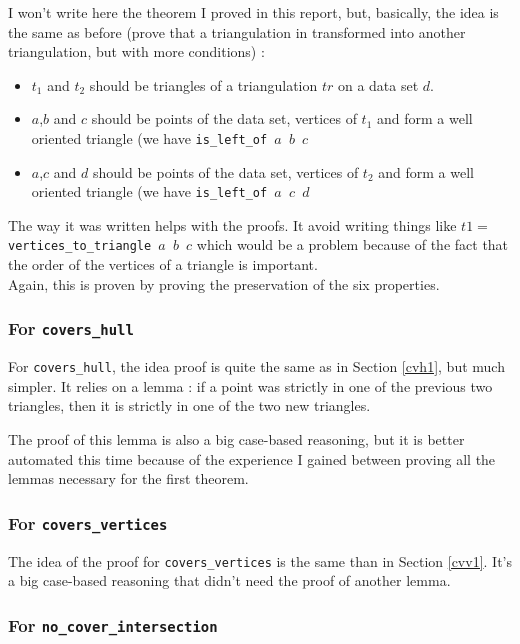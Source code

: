 \documentclass[a4paper,10pt]{article}
\begin{document}
I won't write here the theorem I proved in this report, but, basically, the idea is the same as before (prove that a triangulation in transformed into another triangulation, but with more conditions) :
\begin{itemize}
\item $t_1$ and $t_2$ should be triangles of a triangulation $tr$ on a data set $d$.  
\item $a$,$b$ and $c$ should be points of the data set, vertices of $t_1$ and form a well oriented triangle (we have {\tt is\_left\_of $a$ $b$ $c$}
\item $a$,$c$ and $d$ should be points of the data set, vertices of $t_2$ and form a well oriented triangle (we have {\tt is\_left\_of $a$ $c$ $d$}
\end{itemize}
The way it was written helps with the proofs. It avoid writing things like $t1 = ${\tt vertices\_to\_triangle $a$ $b$ $c$} which would be a problem because of the fact that the order of the vertices of a triangle is important.\\
Again, this is proven by proving the preservation of the six properties.

\subsubsection{For {\tt covers\_hull}} 

For {\tt covers\_hull}, the idea proof is quite the same as in Section \ref{cvh1}, but much simpler.
It relies on a lemma : if a point was strictly in one of the previous two triangles, then it is strictly in one of the two new triangles.

The proof of this lemma is also a big case-based reasoning, but it is better automated this time because of the experience I gained between proving all the lemmas necessary for the first theorem.

\subsubsection{For {\tt covers\_vertices}}

The idea of the proof for {\tt covers\_vertices} is the same than in Section \ref{cvv1}. It's a big case-based reasoning that didn't need the proof of another lemma.

\subsubsection{For {\tt no\_cover\_intersection}}
\end{document}
